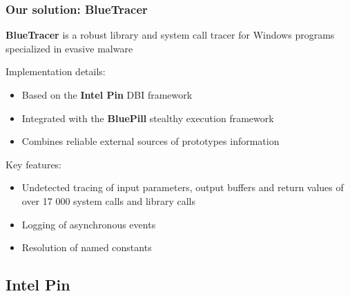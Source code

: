 \documentclass[compress]{beamer}
\begin{document}
\begin{frame}
    \frametitle{Our solution: BlueTracer}

\begin{beamerboxesrounded}[shadow=true]{}
\textbf{BlueTracer} is a robust library and system call tracer for Windows programs specialized in evasive malware
\end{beamerboxesrounded}

\bigskip

Implementation details:
\begin{itemize}
\item Based on the \textbf{Intel Pin} DBI framework
\item Integrated with the \textbf{BluePill} stealthy execution framework
\item Combines reliable external sources of prototypes information
\end{itemize}

\bigskip

Key features:
\begin{itemize}
\item Undetected tracing of input parameters, output buffers and return values of over 17 000 system calls and library calls
\item Logging of asynchronous events
\item Resolution of named constants
\end{itemize}

\end{frame}

\subsection{Intel Pin}
\end{document}
